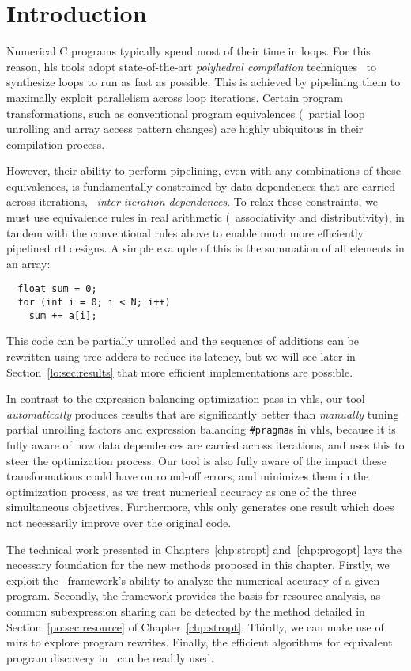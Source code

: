 \section{Introduction}
\label{lo:sec:introduction}

Numerical C programs typically spend most of their time in loops.  For this
reason, \gls{hls} tools adopt state-of-the-art \emph{polyhedral compilation}
techniques~\cite{canis14} to synthesize loops to run as fast as possible.  This
is achieved by pipelining them to maximally exploit parallelism across loop
iterations.  Certain program transformations, such as conventional program
equivalences (\eg~partial loop unrolling and array access pattern changes) are
highly ubiquitous in their compilation process.

However, their ability to perform pipelining, even with any combinations of
these equivalences, is fundamentally constrained by data dependences that
are carried across iterations, \ie~\emph{inter-iteration dependences}.  To
relax these constraints, we must use equivalence rules in real arithmetic
(\eg~associativity and distributivity), in tandem with the conventional rules
above to enable much more efficiently pipelined \gls{rtl} designs.  A simple
example of this is the summation of all elements in an array:
\begin{lstlisting}
  float sum = 0;
  for (int i = 0; i < N; i++)
    sum += a[i];
\end{lstlisting}
This code can be partially unrolled and the sequence of additions can be
rewritten using tree adders to reduce its latency, but we will see later in
Section~\ref{lo:sec:results} that more efficient implementations are possible.

In contrast to the expression balancing optimization pass in \gls{vhls},
our tool \emph{automatically} produces results that are significantly
better than \emph{manually} tuning partial unrolling factors and expression
balancing \verb|#pragma|s in \gls{vhls}, because it is fully aware of how
data dependences are carried across iterations, and uses this to steer the
optimization process.  Our tool is also fully aware of the impact these
transformations could have on round-off errors, and minimizes them in the
optimization process, as we treat numerical accuracy as one of the three
simultaneous objectives.  Furthermore, \gls{vhls} only generates one result
which does not necessarily improve over the original code.

The technical work presented in Chapters~\ref{chp:stropt} and~\ref{chp:progopt}
lays the necessary foundation for the new methods proposed in this chapter.
Firstly, we exploit the \soap~framework's ability to analyze the numerical
accuracy of a given program.  Secondly, the framework provides the basis for
resource analysis, as common subexpression sharing can be detected by the
method detailed in Section~\ref{po:sec:resource} of Chapter~\ref{chp:stropt}.
Thirdly, we can make use of \glspl{mir} to explore program rewrites.  Finally,
the efficient algorithms for equivalent program discovery in \soap~can be
readily used.

